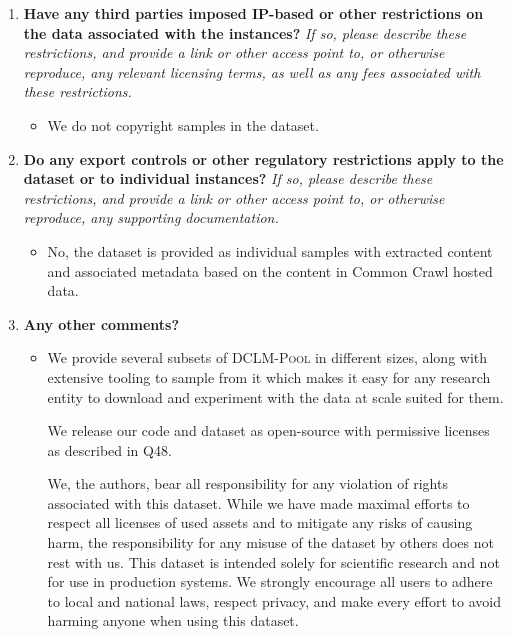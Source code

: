 \documentclass{article}
\newcommand{\rawpool}{\textsc{DCLM-Pool}\xspace}
\newcommand{\commoncrawl}{Common Crawl\xspace}
\begin{document}
\begin{enumerate}[label=Q\arabic*, resume]
\item \textbf{Have any third parties imposed IP-based or other restrictions on the data associated with the instances?} \textit{If so, please describe these restrictions, and provide a link or other access point to, or otherwise reproduce, any relevant licensing terms, as well as any fees associated with these restrictions.}

\begin{itemize}
\item We do not copyright samples in the dataset.
\end{itemize}

\item \textbf{Do any export controls or other regulatory restrictions apply to the dataset or to individual instances?} \textit{If so, please describe these restrictions, and provide a link or other access point to, or otherwise reproduce, any supporting documentation.}


\begin{itemize}
\item No, the dataset is provided as individual samples with extracted content and associated metadata based on the content in \commoncrawl hosted data.
\end{itemize}

\item \textbf{Any other comments?}

\begin{itemize}
\item We provide several subsets of \rawpool in different sizes, along with extensive tooling to sample from it which makes it easy for any research entity to download and experiment with the data at scale suited for them.

We release our code and dataset as open-source with permissive licenses as described in Q48.

We, the authors, bear all responsibility for any violation of rights associated with this dataset. While we have made maximal efforts to respect all licenses of used assets and to mitigate any risks of causing harm, the responsibility for any misuse of the dataset by others does not rest with us. This dataset is intended solely for scientific research and not for use in production systems. We strongly encourage all users to adhere to local and national laws, respect privacy, and make every effort to avoid harming anyone when using this dataset.
\end{itemize}

\end{enumerate}
\end{document}
